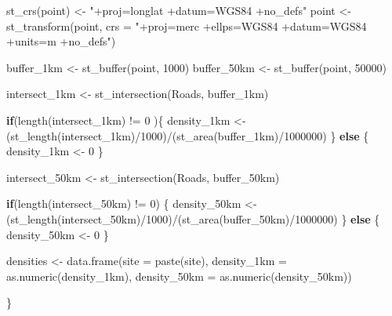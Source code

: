 \documentclass[
]{article}
\newenvironment{Shaded}{\begin{snugshade}}{\end{snugshade}}
\newcommand{\AttributeTok}[1]{\textcolor[rgb]{0.77,0.63,0.00}{#1}}
\newcommand{\ControlFlowTok}[1]{\textcolor[rgb]{0.13,0.29,0.53}{\textbf{#1}}}
\newcommand{\DecValTok}[1]{\textcolor[rgb]{0.00,0.00,0.81}{#1}}
\newcommand{\FunctionTok}[1]{\textcolor[rgb]{0.00,0.00,0.00}{#1}}
\newcommand{\NormalTok}[1]{#1}
\newcommand{\OtherTok}[1]{\textcolor[rgb]{0.56,0.35,0.01}{#1}}
\newcommand{\SpecialCharTok}[1]{\textcolor[rgb]{0.00,0.00,0.00}{#1}}
\newcommand{\StringTok}[1]{\textcolor[rgb]{0.31,0.60,0.02}{#1}}
\begin{document}
\begin{Shaded}
\begin{Highlighting}[]
  \FunctionTok{st\_crs}\NormalTok{(point) }\OtherTok{\textless{}{-}} \StringTok{"+proj=longlat +datum=WGS84 +no\_defs"}
\NormalTok{  point }\OtherTok{\textless{}{-}} \FunctionTok{st\_transform}\NormalTok{(point, }\AttributeTok{crs =} \StringTok{"+proj=merc +ellps=WGS84 +datum=WGS84 +units=m +no\_defs"}\NormalTok{)}
  
  
\NormalTok{  buffer\_1km }\OtherTok{\textless{}{-}} \FunctionTok{st\_buffer}\NormalTok{(point, }\DecValTok{1000}\NormalTok{)}
\NormalTok{  buffer\_50km }\OtherTok{\textless{}{-}} \FunctionTok{st\_buffer}\NormalTok{(point, }\DecValTok{50000}\NormalTok{)}
  
  
\NormalTok{  intersect\_1km }\OtherTok{\textless{}{-}} \FunctionTok{st\_intersection}\NormalTok{(Roads, buffer\_1km)}
  
  \ControlFlowTok{if}\NormalTok{(}\FunctionTok{length}\NormalTok{(intersect\_1km) }\SpecialCharTok{!=} \DecValTok{0}\NormalTok{ )\{}
\NormalTok{    density\_1km }\OtherTok{\textless{}{-}}\NormalTok{ (}\FunctionTok{st\_length}\NormalTok{(intersect\_1km)}\SpecialCharTok{/}\DecValTok{1000}\NormalTok{)}\SpecialCharTok{/}\NormalTok{(}\FunctionTok{st\_area}\NormalTok{(buffer\_1km)}\SpecialCharTok{/}\DecValTok{1000000}\NormalTok{)}
\NormalTok{  \} }\ControlFlowTok{else}\NormalTok{ \{}
\NormalTok{    density\_1km }\OtherTok{\textless{}{-}} \DecValTok{0}
\NormalTok{  \}}
  
\NormalTok{  intersect\_50km }\OtherTok{\textless{}{-}} \FunctionTok{st\_intersection}\NormalTok{(Roads, buffer\_50km)}
  
  \ControlFlowTok{if}\NormalTok{(}\FunctionTok{length}\NormalTok{(intersect\_50km) }\SpecialCharTok{!=} \DecValTok{0}\NormalTok{) \{}
\NormalTok{    density\_50km }\OtherTok{\textless{}{-}}\NormalTok{ (}\FunctionTok{st\_length}\NormalTok{(intersect\_50km)}\SpecialCharTok{/}\DecValTok{1000}\NormalTok{)}\SpecialCharTok{/}\NormalTok{(}\FunctionTok{st\_area}\NormalTok{(buffer\_50km)}\SpecialCharTok{/}\DecValTok{1000000}\NormalTok{)}
\NormalTok{  \} }\ControlFlowTok{else}\NormalTok{ \{}
\NormalTok{    density\_50km }\OtherTok{\textless{}{-}} \DecValTok{0}
\NormalTok{  \}}
  
  
\NormalTok{  densities }\OtherTok{\textless{}{-}} \FunctionTok{data.frame}\NormalTok{(}\AttributeTok{site =} \FunctionTok{paste}\NormalTok{(site), }\AttributeTok{density\_1km =} \FunctionTok{as.numeric}\NormalTok{(density\_1km), }\AttributeTok{density\_50km =} \FunctionTok{as.numeric}\NormalTok{(density\_50km))}

\NormalTok{                          \}}


\end{Highlighting}
\end{Shaded}
\end{document}
